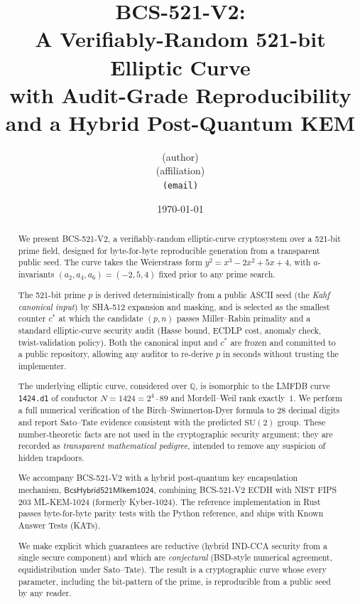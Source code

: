 \documentclass[11pt,a4paper]{article}
\title{
  \textsf{BCS-521-V2}: \\[2pt]
  A Verifiably-Random 521-bit Elliptic Curve \\
  with Audit-Grade Reproducibility \\
  and a Hybrid Post-Quantum KEM
}
\author{(author)\\\small (affiliation)\\\small \texttt{(email)}}
\date{\today}
\theoremstyle{plain}
\theoremstyle{definition}
\newcommand{\Q}{\mathbb{Q}}
\newcommand{\BCSV}{\textsf{BCS\hbox{-}521\hbox{-}V2}}
\newcommand{\MLKEM}{\textsf{ML\hbox{-}KEM\hbox{-}1024}}
\begin{document}
\maketitle

\begin{abstract}
We present \BCSV{}, a verifiably-random elliptic-curve cryptosystem
over a 521-bit prime field, designed for byte-for-byte reproducible
generation from a transparent public seed. The curve takes the
Weierstrass form $y^2 = x^3 - 2x^2 + 5x + 4$, with $a$-invariants
$(a_2,a_4,a_6) = (-2,5,4)$ fixed prior to any prime search.

The 521-bit prime $p$ is derived deterministically from a public
ASCII seed (the \emph{Kahf canonical input}) by SHA-512 expansion and
masking, and is selected as the smallest counter $c^{*}$ at which the
candidate $(p, n)$ passes Miller--Rabin primality and a standard
elliptic-curve security audit (Hasse bound, ECDLP cost, anomaly check,
twist-validation policy). Both the canonical input and $c^{*}$ are
frozen and committed to a public repository, allowing any auditor to
re-derive $p$ in seconds without trusting the implementer.

The underlying elliptic curve, considered over $\Q$, is isomorphic to
the LMFDB curve \texttt{1424.d1} of conductor $N = 1424 = 2^4 \cdot 89$
and Mordell--Weil rank exactly~$1$. We perform a full numerical
verification of the Birch--Swinnerton-Dyer formula to 28 decimal digits
and report Sato--Tate evidence consistent with the predicted
$\mathrm{SU}(2)$ group. These number-theoretic facts are not used in
the cryptographic security argument; they are recorded as
\emph{transparent mathematical pedigree}, intended to remove any
suspicion of hidden trapdoors.

We accompany \BCSV{} with a hybrid post-quantum key encapsulation
mechanism, $\textsf{BcsHybrid521Mlkem1024}$, combining \BCSV{} ECDH
with NIST FIPS 203 \MLKEM{} (formerly Kyber-1024). The reference
implementation in Rust passes byte-for-byte parity tests with the
Python reference, and ships with Known Answer Tests (KATs).

We make explicit which guarantees are reductive (hybrid IND-CCA
security from a single secure component) and which are
\emph{conjectural} (BSD-style numerical agreement, equidistribution
under Sato--Tate). The result is a cryptographic curve whose every
parameter, including the bit-pattern of the prime, is reproducible
from a public seed by any reader.
\end{abstract}
\end{document}
